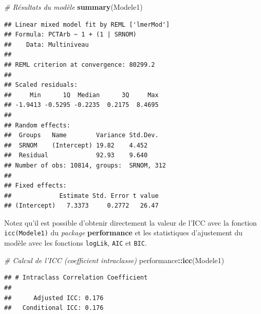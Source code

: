 \documentclass[
  11pt,
  french,
]{book}
\makeatletter
\newenvironment{Shaded}{\begin{snugshade}}{\end{snugshade}}
\newcommand{\CommentTok}[1]{\textcolor[rgb]{0.56,0.35,0.01}{\textit{#1}}}
\newcommand{\DataTypeTok}[1]{\textcolor[rgb]{0.13,0.29,0.53}{#1}}
\newcommand{\DecValTok}[1]{\textcolor[rgb]{0.00,0.00,0.81}{#1}}
\newcommand{\KeywordTok}[1]{\textcolor[rgb]{0.13,0.29,0.53}{\textbf{#1}}}
\newcommand{\NormalTok}[1]{#1}
\newcommand{\OperatorTok}[1]{\textcolor[rgb]{0.81,0.36,0.00}{\textbf{#1}}}
\newcommand{\StringTok}[1]{\textcolor[rgb]{0.31,0.60,0.02}{#1}}
\newenvironment{kframe}{%
\medskip{}
\setlength{\fboxsep}{.8em}
 \def\at@end@of@kframe{}%
 \ifinner\ifhmode%
  \def\at@end@of@kframe{\end{minipage}}%
  \begin{minipage}{\columnwidth}%
 \fi\fi%
 \def\FrameCommand##1{\hskip\@totalleftmargin \hskip-\fboxsep
 \colorbox{shadecolor}{##1}\hskip-\fboxsep
     \hskip-\linewidth \hskip-\@totalleftmargin \hskip\columnwidth}%
 \MakeFramed {\advance\hsize-\width
   \@totalleftmargin\z@ \linewidth\hsize
   \@setminipage}}%
 {\par\unskip\endMakeFramed%
 \at@end@of@kframe}
\renewenvironment{Shaded}{\begin{kframe}}{\end{kframe}}
\makeatother
\begin{document}
\begin{Shaded}
\begin{Highlighting}[]
\CommentTok{# Résultats du modèle}
\KeywordTok{summary}\NormalTok{(Modele1)}
\end{Highlighting}
\end{Shaded}

\begin{verbatim}
## Linear mixed model fit by REML ['lmerMod']
## Formula: PCTArb ~ 1 + (1 | SRNOM)
##    Data: Multiniveau
## 
## REML criterion at convergence: 80299.2
## 
## Scaled residuals: 
##     Min      1Q  Median      3Q     Max 
## -1.9413 -0.5295 -0.2235  0.2175  8.4695 
## 
## Random effects:
##  Groups   Name        Variance Std.Dev.
##  SRNOM    (Intercept) 19.82    4.452   
##  Residual             92.93    9.640   
## Number of obs: 10814, groups:  SRNOM, 312
## 
## Fixed effects:
##             Estimate Std. Error t value
## (Intercept)   7.3373     0.2772   26.47
\end{verbatim}

Notez qu'il est possible d'obtenir directement la valeur de l'ICC avec la fonction \texttt{icc(Modele1)} du \emph{package} \textbf{performance} et les statistiques d'ajustement du modèle avec les fonctions \texttt{logLik}, \texttt{AIC} et \texttt{BIC}.

\begin{Shaded}
\begin{Highlighting}[]
\CommentTok{# Calcul de l'ICC (coefficient intraclasse)}
\NormalTok{performance}\OperatorTok{::}\KeywordTok{icc}\NormalTok{(Modele1)}
\end{Highlighting}
\end{Shaded}

\begin{verbatim}
## # Intraclass Correlation Coefficient
## 
##      Adjusted ICC: 0.176
##   Conditional ICC: 0.176
\end{verbatim}

\begin{Shaded}
\end{Shaded}
\end{document}

